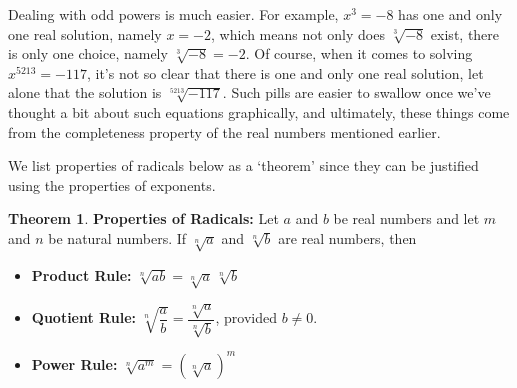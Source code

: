 \documentclass[11pt]{article}
\theoremstyle{definition}  %
\newtheorem{thm}{\bf Theorem}
\newcommand{\bbm}{\begin{boxedminipage}{6.41in}}
\newcommand{\ebm}{\end{boxedminipage}}
\begin{document}
\smallskip

Dealing with odd powers is much easier. For example, $x^3 = -8$ has one and only one real solution, namely $x = -2$, which means not only does $\sqrt[3]{-8}$ exist, there is only one choice, namely $\sqrt[3]{-8} = -2$. Of course, when it comes to solving $x^{5213} = -117$, it's not so clear that there is one and only one real solution, let alone that the solution is $\sqrt[5213]{-117}$. Such pills are easier to swallow once we've thought a bit about such equations graphically, and ultimately, these things come from the completeness property of the real numbers mentioned earlier.  

\smallskip

We list properties of radicals below as a `theorem' since they can be justified using the properties of exponents.

\medskip

\colorbox{ResultColor}{\bbm
\begin{thm}  \textbf{Properties of Radicals:} Let $a$ and $b$ be real numbers and let $m$ and $n$ be natural numbers.  If $\sqrt[n]{a}$ and $\sqrt[n]{b}$ are real numbers, then

\label{radicalprops}

\begin{itemize}

\item  \textbf{Product Rule:}  $\sqrt[n]{ab} = \sqrt[n]{a} \, \sqrt[n]{b}$ 

\item  \textbf{Quotient Rule:}  $\sqrt[n]{\dfrac{a}{b}} = \dfrac{\sqrt[n]{a}}{\sqrt[n]{b}}$, provided $b \neq 0$. 

\item  \textbf{Power Rule:} $\sqrt[n]{a^m} = \left(\sqrt[n]{a}\right)^m$ 

\end{itemize}

\end{thm}

\ebm}

\medskip
\end{document}
